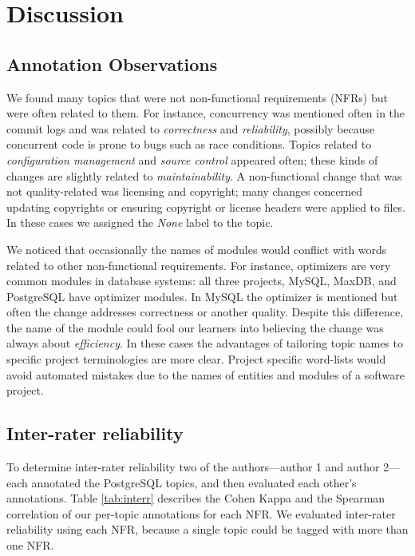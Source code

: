 \documentclass[smallextended]{svjour3}       %
\begin{document}
\section{Discussion}
\label{sec:limit}

\subsection{Annotation Observations}
We found many topics that were not non-functional requirements (NFRs) but were often related to them. 
For instance, concurrency was mentioned often in the commit logs and
was related to \emph{correctness} and \emph{reliability}, possibly because concurrent code is prone to bugs such as race conditions. %
Topics related to \emph{configuration management} and \emph{source control} appeared often; %
these kinds of changes are slightly related to \emph{maintainability}. 
A non-functional change that was not quality-related was licensing and
copyright; many changes concerned updating copyrights or
ensuring copyright or license headers were applied to files. In these
cases we assigned the \emph{None} label to the topic.

We noticed that occasionally the names of modules would conflict with words related to other non-functional requirements. 
For instance, optimizers are very common modules in database systems:
all three projects, MySQL, MaxDB, and PostgreSQL have optimizer modules. 
In MySQL the optimizer is mentioned but often the change addresses  correctness or another quality. 
Despite this difference, the name of the module could fool our learners into believing the change was always about \emph{efficiency}. 
In these cases the advantages of tailoring topic names to specific project terminologies are more clear. 
Project specific word-lists would avoid automated mistakes due to the names of entities and modules of a software project.

\subsection{Inter-rater reliability}
\label{sec:inter-rater}
To determine inter-rater reliability two of the authors---author 1 and author 2---each annotated the PostgreSQL topics,
and then evaluated each other's annotations. 
Table \ref{tab:interr} describes the Cohen Kappa and the Spearman
correlation of our per-topic annotations for each NFR. We 
evaluated inter-rater reliability using each NFR, because a single topic could be
tagged with more than one NFR.
\end{document}
